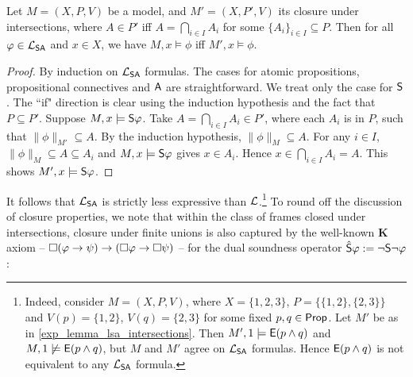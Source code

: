 \begin{lemma}
\label{exp_lemma_lsa_intersections}

    Let $M = (X, P, V)$ be a model, and $M' = (X, P', V)$ its closure under
    intersections, where $A \in P'$ iff $A = \bigcap_{i \in I}{A_i}$ for some
    $\{A_i\}_{i \in I} \subseteq P$. Then for all $\phi \in \cLSA$ and $x \in
    X$, we have $M, x \models \phi$ iff $M', x \models \phi$.

\end{lemma}

\begin{proof}

    By induction on $\cLSA$ formulas. The cases for atomic
    propositions, propositional connectives and $\A$ are straightforward. We
    treat only the case for $\S$.
    The ``if" direction is clear using
    the induction hypothesis and the fact that $P \subseteq P'$. Suppose $M, x
    \models \S\phi$. Take $A = \bigcap_{i \in I}{A_i} \in P'$, where each $A_i$
    is in $P$, such that $\|\phi\|_{M'} \subseteq A$. By the induction
    hypothesis, $\|\phi\|_M \subseteq A$. For any $i \in I$, $\|\phi\|_M
    \subseteq A \subseteq A_i$ and $M, x \models \S\phi$ gives $x \in A_i$.
    Hence $x \in \bigcap_{i \in I}{A_i} = A$. This shows $M', x \models
    \S\phi$.
\end{proof}

It follows that $\cLSA$ is strictly less expressive than $\cL$.\footnote{
    Indeed, consider $M = (X, P, V)$, where $X = \{1, 2, 3\}$, $P = \{\{1, 2\}, \{2,
    3\}\}$ and $V(p) = \{1, 2\}$, $V(q) = \{2, 3\}$ for some fixed $p, q \in
    \Prop$. Let $M'$ be as in \cref{exp_lemma_lsa_intersections}. Then $M', 1
    \models \E(p \land q)$ and $M, 1 \not\models \E(p \land q)$, but $M$ and
    $M'$ agree on $\cLSA$ formulas. Hence $\E(p \land q)$ is not equivalent to
    any $\cLSA$ formula.
}
%
To round off the discussion of closure properties, we note that within the
class of frames closed under intersections, closure under finite unions is also
captured by the well-known \textbf{K} axiom -- $\Box(\phi \limplies \psi)
\limplies (\Box\phi \limplies \Box\psi)$ -- for the dual soundness operator
$\hat{\S}\phi := \neg\S\neg\phi$:

